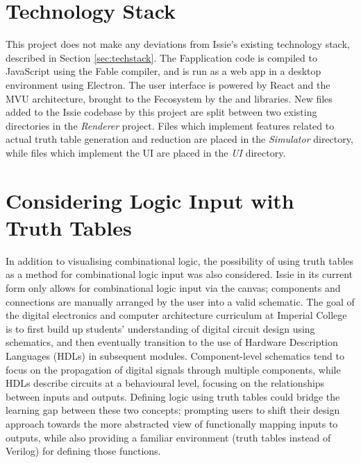 \section{Technology Stack}
This project does not make any deviations from Issie's existing technology stack, described in Section \ref{sec:techstack}. The F\fsharp application code is compiled to JavaScript using the Fable compiler, and is run as a web app in a desktop environment using Electron. The user interface is powered by React and the MVU architecture, brought to the F\fsharp ecosystem by the  and  libraries. New files added to the Issie codebase by this project are split between two existing directories in the \textit{Renderer} project. Files which implement features related to actual truth table generation and reduction are placed in the \textit{Simulator} directory, while files which implement the UI are placed in the \textit{UI} directory. 



\section{Considering Logic Input with Truth Tables}
In addition to visualising combinational logic, the possibility of using truth tables as a method for combinational logic input was also considered. Issie in its current form only allows for combinational logic input via the canvas; components and connections are manually arranged by the user into a valid schematic. 
The goal of the digital electronics and computer architecture curriculum at Imperial College is to first build up students’ understanding of digital circuit design using schematics, and then eventually transition to the use of Hardware Description Languages (HDLs) in subsequent modules. Component-level schematics tend to focus on the propagation of digital signals through multiple components, while HDLs describe circuits at a behavioural level, focusing on the relationships between inputs and outputs. Defining logic using truth tables could bridge the learning gap between these two concepts; prompting users to shift their design approach towards the more abstracted view of functionally mapping inputs to outputs, while also providing a familiar environment (truth tables instead of Verilog) for defining those functions.

